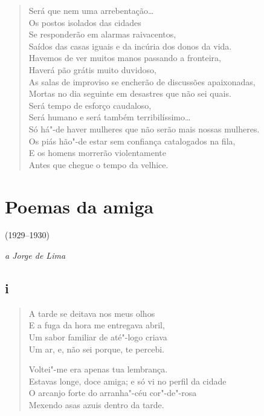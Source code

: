 \begin{verse}
Será que nem uma arrebentação\ldots{}\\
Os postos isolados das cidades\\
Se responderão em alarmas raivacentos,\\
Saídos das casas iguais e da incúria dos donos da vida.\\
Havemos de ver muitos manos passando a fronteira,\\
Haverá pão grátis muito duvidoso,\\
As salas de improviso se encherão de discussões apaixonadas,\\
Mortas no dia seguinte em desastres que não sei quais.\\
Será tempo de esforço caudaloso,\\
Será humano e será também terribilíssimo\ldots{}\\
Só há"-de haver mulheres que não serão mais nossas mulheres.\\
Os piás hão"-de estar sem confiança catalogados na fila,\\
E os homens morrerão violentamente\\
Antes que chegue o tempo da velhice.
\end{verse}

\chapter{Poemas da amiga}{(1929--1930)}{}

\begin{flushright}
\emph{a Jorge de Lima}
\end{flushright}

\section*{i}


\begin{verse}
A tarde se deitava nos meus olhos\\
E a fuga da hora me entregava abril,\\
Um sabor familiar de até"-logo criava\\
Um ar, e, não sei porque, te percebi.

Voltei"-me era apenas tua lembrança.\\
Estavas longe, doce amiga; e só vi no perfil da cidade\\
O arcanjo forte do arranha"-céu cor"-de"-rosa\\
Mexendo asas azuis dentro da tarde.
\end{verse}


